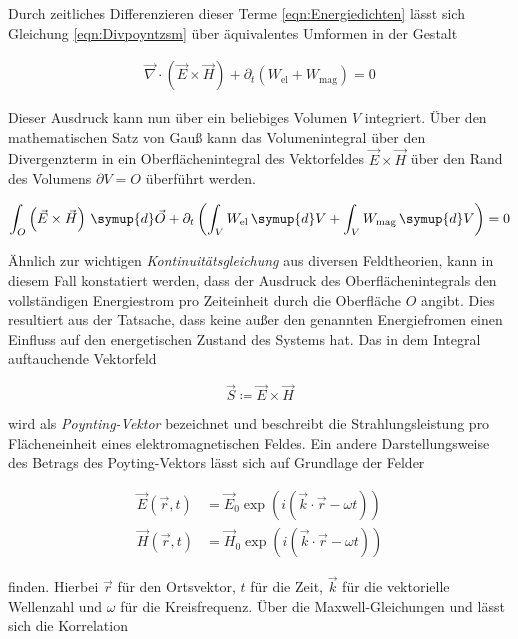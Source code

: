 \noindent Durch zeitliches Differenzieren dieser Terme \eqref{eqn:Energiedichten} lässt sich Gleichung \eqref{eqn:Divpoyntzsm} über äquivalentes Umformen 
in der Gestalt 

\begin{align*}
    \vec{\nabla}\cdot\left(\vec{E}\times\vec{H}\right) + \partial_t\left(W_\text{el}+W_\text{mag}\right) = 0
\end{align*}

\noindent Dieser Ausdruck kann nun über ein beliebiges Volumen $V$ integriert. Über den mathematischen Satz von Gauß kann das Volumenintegral über den 
Divergenzterm in ein Oberflächenintegral des Vektorfeldes $\vec{E}\times\vec{H}$ über den Rand des Volumens $\partial{}V=O$ überführt werden. 

\begin{align}
    \int_O \left(\vec{E}\times\vec{H}\right)\,\symup{d}\vec{O} + \partial_t\left(\int_V W_\text{el}\,\symup{d}V + \int_V W_\text{mag}\,\symup{d}V\right) = 0
\label{eqn:Gauss}
\end{align}

\noindent Ähnlich zur wichtigen \emph{Kontinuitätsgleichung} aus diversen Feldtheorien, kann in diesem Fall konstatiert werden, dass der Ausdruck des Oberflächenintegrals
den vollständigen Energiestrom pro Zeiteinheit durch die Oberfläche $O$ angibt. Dies resultiert aus der Tatsache, dass keine außer den genannten Energiefromen 
einen Einfluss auf den energetischen Zustand des Systems hat. Das in dem Integral auftauchende Vektorfeld 

\begin{equation}
    \vec{S} \coloneqq \vec{E}\times\vec{H} 
\end{equation}

\noindent wird als \emph{Poynting-Vektor} bezeichnet und beschreibt die Strahlungsleistung pro Flächeneinheit eines elektromagnetischen Feldes. Ein andere 
Darstellungsweise des Betrags des Poyting-Vektors lässt sich auf Grundlage der Felder 

\begin{align*}
    \vec{E}(\vec{r},t) &= \vec{E}_0\exp\left(i(\vec{k}\cdot\vec{r}-\omega{}t)\right)\\
    \vec{H}(\vec{r},t) &= \vec{H}_0\exp\left(i(\vec{k}\cdot\vec{r}-\omega{}t)\right)
\end{align*}

\noindent finden. Hierbei $\vec{r}$ für den Ortsvektor, $t$ für die Zeit, $\vec{k}$ für die vektorielle Wellenzahl und $\omega$ für die Kreisfrequenz. Über die Maxwell-Gleichungen 
 und  lässt sich die Korrelation 

